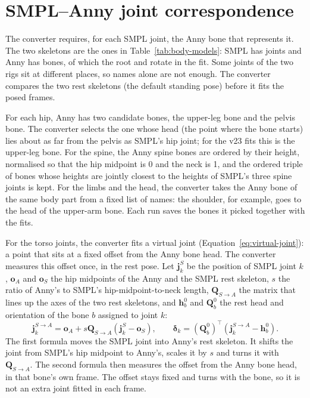 \chapter{SMPL--Anny joint correspondence}
\label{app:joints}

The converter requires, for each SMPL joint, the Anny bone that represents it. The two skeletons are the ones in
Table~\ref{tab:body-models}: SMPL has \BgSmplJoints{} joints and Anny has \BgAnnyBones{} bones, of which the root and
\DataFittedBones{} rotate in the fit. Some joints of the two rigs sit at different places, so names alone are not
enough. The converter compares the two rest skeletons (the default standing pose) before it fits the posed frames.

For each hip, Anny has two candidate bones, the upper-leg bone and the pelvis bone. The converter selects the one
whose head (the point where the bone starts) lies about as far from the pelvis as SMPL's hip joint; for the v23 fits
this is the upper-leg bone. For the spine, the Anny spine bones are ordered by their height, normalised so that the
hip midpoint is 0 and the neck is 1, and the ordered triple of bones whose heights are jointly closest to the heights
of SMPL's three spine joints is kept. For the limbs and the
head, the converter takes the Anny bone of the same body part from a fixed list of names: the shoulder, for example,
goes to the head of the upper-arm bone. Each run saves the bones it picked together with the fits.

For the torso joints, the converter fits a virtual joint (Equation~\eqref{eq:virtual-joint}): a point that sits at a
fixed offset from the Anny bone head. The converter measures this offset once, in the rest pose. Let $\mathbf j^S_k$
be the position of SMPL joint $k$, $\mathbf o_A$ and $\mathbf o_S$ the hip midpoints of the Anny and the SMPL rest
skeleton, $s$ the ratio of Anny's to SMPL's hip-midpoint-to-neck length, $\mathbf Q_{S\to A}$ the matrix that lines
up the axes of the two rest skeletons, and $\mathbf h^0_b$ and $\mathbf Q^0_b$ the rest head and orientation of the
bone $b$ assigned to joint $k$:
\begin{equation}
 \mathbf j^{S\to A}_k=\mathbf o_A+s\mathbf Q_{S\to A}(\mathbf j^S_k-\mathbf o_S),\qquad
 \boldsymbol\delta_k=(\mathbf Q^0_b)^\top(\mathbf j^{S\to A}_k-\mathbf h^0_b).
 \label{eq:rest-offset}
\end{equation}
The first formula moves the SMPL joint into Anny's rest skeleton. It shifts the joint from SMPL's hip
midpoint to Anny's, scales it by $s$ and turns it with $\mathbf Q_{S\to A}$. The second formula then measures the
offset from the Anny bone head, in that bone's own frame. The offset stays fixed and
turns with the bone, so it is not an extra joint fitted in each frame.

